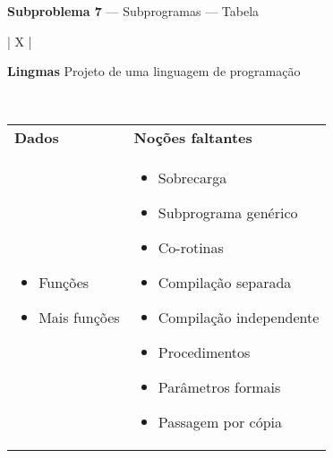 \documentclass[12pt, a4paper]{article}
\begin{document}
\begin{center}
\large \textbf{Subproblema 7} --- Subprogramas --- Tabela
\end{center}

\bigskip

\begin{longtabu}{| X |}
    \hline
    \begin{center}
        \large \textbf{Lingmas} \linebreak
        Projeto de uma linguagem de programação
    \end{center}
    \\ \hline

    \begin{tabu}{ X | X }
        \textbf{Dados} &
        \textbf{Noções faltantes}
        \\
        \begin{minipage}[t]{\linewidth}
        \begin{itemize}[itemsep=.5ex,parsep=.0ex,after=\strut,leftmargin=15pt]
            \item
                Funções
            \item
                Mais funções
        \end{itemize}
        \end{minipage}
        &
        \begin{minipage}[t]{\linewidth}
        \begin{itemize}[itemsep=.5ex,parsep=.0ex,after=\strut,leftmargin=15pt]
            \item
            Sobrecarga
            \item
            Subprograma genérico
            \item
            Co-rotinas
            \item
            Compilação separada
            \item
            Compilação independente
            \item
            Procedimentos
            \item
            Parâmetros formais
            \item
            Passagem por cópia
        \end{itemize}
        \end{minipage}
    \end{tabu}
    \\ \hline


\end{longtabu}
\end{document}
